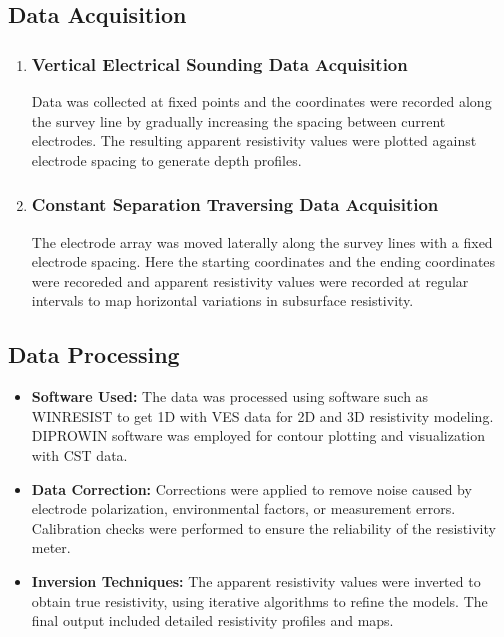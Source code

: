 \documentclass[12pt,a4paper]{report}
\begin{document}
\subsection{Data Acquisition}
\begin{enumerate}
    \item \subsubsection{Vertical Electrical Sounding Data Acquisition}
    Data was collected at fixed points and the coordinates were recorded along the survey line by gradually increasing the spacing between current electrodes. The resulting apparent resistivity values were plotted against electrode spacing to generate depth profiles.
    \item \subsubsection{Constant Separation Traversing Data Acquisition}
    The electrode array was moved laterally along the survey lines with a fixed electrode spacing. Here the starting coordinates and the ending coordinates were recoreded and apparent resistivity values were recorded at regular intervals to map horizontal variations in subsurface resistivity.
\end{enumerate}

\subsection{Data Processing}
\begin{itemize}
    \item \textbf{Software Used:} The data was processed using software such as WINRESIST to get 1D with VES data for 2D and 3D resistivity modeling. DIPROWIN software was employed for contour plotting and visualization with CST data.
    \item \textbf{Data Correction:} Corrections were applied to remove noise caused by electrode polarization, environmental factors, or measurement errors. Calibration checks were performed to ensure the reliability of the resistivity meter.
    \item \textbf{Inversion Techniques:} The apparent resistivity values were inverted to obtain true resistivity, using iterative algorithms to refine the models. The final output included detailed resistivity profiles and maps.
\end{itemize}
\end{document}
